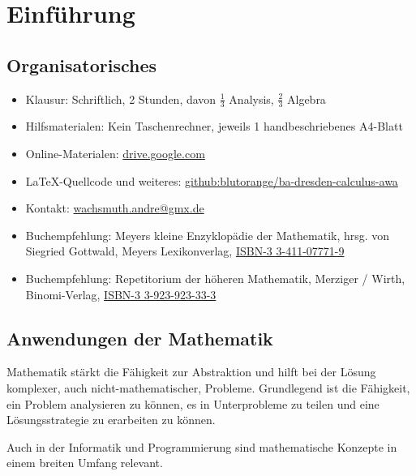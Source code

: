 \chapter{Einführung}

\section{Organisatorisches}

\begin{itemize}
	\item Klausur: Schriftlich, 2 Stunden, davon $\frac{1}{3}$ Analysis, $\frac{2}{3}$ Algebra
	\item Hilfsmaterialen: Kein Taschenrechner, jeweils 1 handbeschriebenes A4-Blatt
	\item Online-Materialen: \href{https://drive.google.com/drive/folders/1CJ0226zg1_bnbt7IopCLwDuK2hkOgHya?usp=sharing}{drive.google.com}
	\item \LaTeX-Quellcode und weiteres: \href{https://github.com/blutorange/ba-dresden-calculus-awa}{github:blutorange/ba-dresden-calculus-awa}
	\item Kontakt: \href{mailto:wachsmuth.andre@gmx.de?subject=BA/Analysis 2020: }{wachsmuth.andre@gmx.de}
	\item Buchempfehlung: Meyers kleine Enzyklopädie der Mathematik, hrsg. von Siegried Gottwald, Meyers Lexikonverlag, \href{https://www.amazon.de/-/en/Siegfried-Gottwald/dp/3411077719}{ISBN-3 3-411-07771-9}
	\item Buchempfehlung: Repetitorium der höheren Mathematik, Merziger / Wirth, Binomi-Verlag, \href{https://www.amazon.de/-/en/Gerhard-Merziger/dp/3923923333}{ISBN-3 3-923-923-33-3}
\end{itemize}

\section{Anwendungen der Mathematik}

Mathematik stärkt die Fähigkeit zur Abstraktion und hilft bei der Lösung komplexer, auch nicht-mathematischer, Probleme. Grundlegend
ist die Fähigkeit, ein Problem analysieren zu können, es in Unterprobleme zu teilen und eine Lösungsstrategie zu erarbeiten zu können.

Auch in der Informatik und Programmierung sind mathematische Konzepte in einem breiten Umfang relevant.

